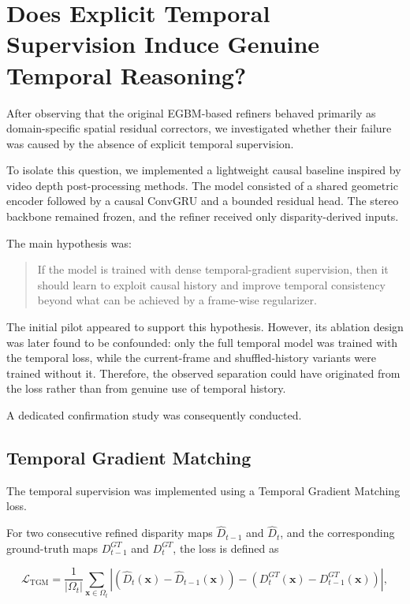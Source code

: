 \documentclass[11pt,a4paper]{article}
\begin{document}
\section{Does Explicit Temporal Supervision Induce Genuine Temporal Reasoning?}

After observing that the original EGBM-based refiners behaved primarily as
domain-specific spatial residual correctors, we investigated whether their failure
was caused by the absence of explicit temporal supervision.

To isolate this question, we implemented a lightweight causal baseline inspired by
video depth post-processing methods. The model consisted of a shared geometric
encoder followed by a causal ConvGRU and a bounded residual head. The stereo
backbone remained frozen, and the refiner received only disparity-derived inputs.

The main hypothesis was:

\begin{quote}
If the model is trained with dense temporal-gradient supervision, then it should
learn to exploit causal history and improve temporal consistency beyond what can
be achieved by a frame-wise regularizer.
\end{quote}

The initial pilot appeared to support this hypothesis. However, its ablation design
was later found to be confounded: only the full temporal model was trained with the
temporal loss, while the current-frame and shuffled-history variants were trained
without it. Therefore, the observed separation could have originated from the loss
rather than from genuine use of temporal history.

A dedicated confirmation study was consequently conducted.

\subsection{Temporal Gradient Matching}

The temporal supervision was implemented using a Temporal Gradient Matching
loss.

For two consecutive refined disparity maps
$\hat{D}_{t-1}$ and $\hat{D}_{t}$, and the corresponding ground-truth maps
$D^{GT}_{t-1}$ and $D^{GT}_{t}$, the loss is defined as

\begin{equation}
\mathcal{L}_{\mathrm{TGM}}
=
\frac{1}{|\Omega_t|}
\sum_{\mathbf{x}\in\Omega_t}
\left|
\left(
\hat{D}_{t}(\mathbf{x})
-
\hat{D}_{t-1}(\mathbf{x})
\right)
-
\left(
D^{GT}_{t}(\mathbf{x})
-
D^{GT}_{t-1}(\mathbf{x})
\right)
\right|,
\end{equation}
\end{document}
